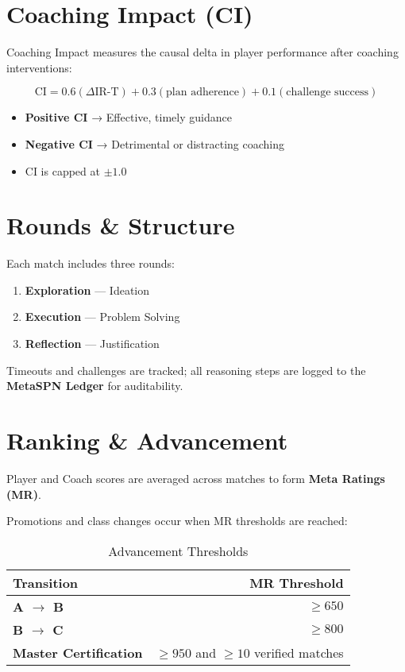 \section{Coaching Impact (CI)}

Coaching Impact measures the causal delta in player performance after coaching interventions:

\begin{equation}
\text{CI} = 0.6(\Delta\text{IR-T}) + 0.3(\text{plan adherence}) + 0.1(\text{challenge success})
\end{equation}

\begin{itemize}[leftmargin=*]
  \item \textbf{Positive CI} → Effective, timely guidance
  \item \textbf{Negative CI} → Detrimental or distracting coaching
  \item CI is capped at $\pm 1.0$
\end{itemize}

\section{Rounds \& Structure}

Each match includes three rounds:

\begin{enumerate}
  \item \textbf{Exploration} — Ideation
  \item \textbf{Execution} — Problem Solving
  \item \textbf{Reflection} — Justification
\end{enumerate}

Timeouts and challenges are tracked; all reasoning steps are logged to the \textbf{MetaSPN Ledger} for auditability.

\section{Ranking \& Advancement}

Player and Coach scores are averaged across matches to form \textbf{Meta Ratings (MR)}.

Promotions and class changes occur when MR thresholds are reached:

\begin{table}[h]
\centering
\begin{tabular}{@{}lr@{}}
\toprule
\textbf{Transition} & \textbf{MR Threshold} \\ \midrule
\textbf{A $\rightarrow$ B} & $\geq 650$ \\
\textbf{B $\rightarrow$ C} & $\geq 800$ \\
\textbf{Master Certification} & $\geq 950$ and $\geq 10$ verified matches \\ \bottomrule
\end{tabular}
\caption{Advancement Thresholds}
\label{tab:advancement_thresholds}
\end{table}

